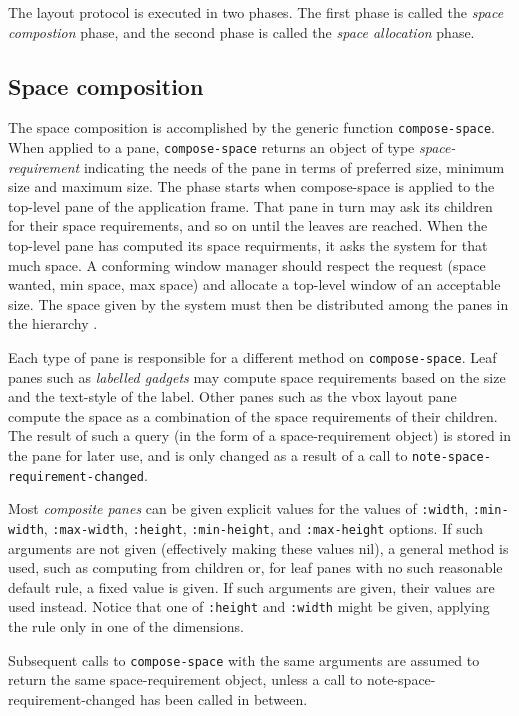 The layout protocol is executed in two phases.  The first phase is
called the \emph{space compostion} phase, and the second phase is
called the \emph{space allocation} phase.

\subsection{Space composition}

The space composition is accomplished by the generic function
\texttt{compose-space}.  When applied to a pane, \texttt{compose-space}
returns an object of type \emph{space-requirement} indicating the needs
of the pane in terms of preferred size, minimum size and maximum size.
The phase starts when compose-space is applied to the top-level pane of
the application frame.  That pane in turn may ask its children for their
space requirements, and so on until the leaves are reached.  When the
top-level pane has computed its space requirments, it asks the system
for that much space.  A conforming window manager should respect the
request (space wanted, min space, max space) and allocate a top-level
window of an acceptable size.  The space given by the system must then
be distributed among the panes in the hierarchy
.

Each type of pane is responsible for a different method on
\texttt{compose-space}.  Leaf panes such as \emph{labelled gadgets} may
compute space requirements based on the size and the text-style of the
label.  Other panes such as the vbox layout pane compute the space as a
combination of the space requirements of their children.  The result of
such a query (in the form of a space-requirement object) is stored in
the pane for later use, and is only changed as a result of a call to
\texttt{note-space-requirement-changed}.

Most \emph{composite panes} can be given explicit values for the values
of \texttt{:width}, \texttt{:min-width}, \texttt{:max-width},
\texttt{:height}, \texttt{:min-height}, and \texttt{:max-height}
options.  If such arguments are not given (effectively making these
values nil), a general method is used, such as computing from children
or, for leaf panes with no such reasonable default rule, a fixed value
is given.  If such arguments are given, their values are used instead.
Notice that one of \texttt{:height} and \texttt{:width} might be
given, applying the rule only in one of the dimensions.

Subsequent calls to \texttt{compose-space} with the same arguments are
assumed to return the same space-requirement object, unless a call to
note-space-requirement-changed has been called in between.


